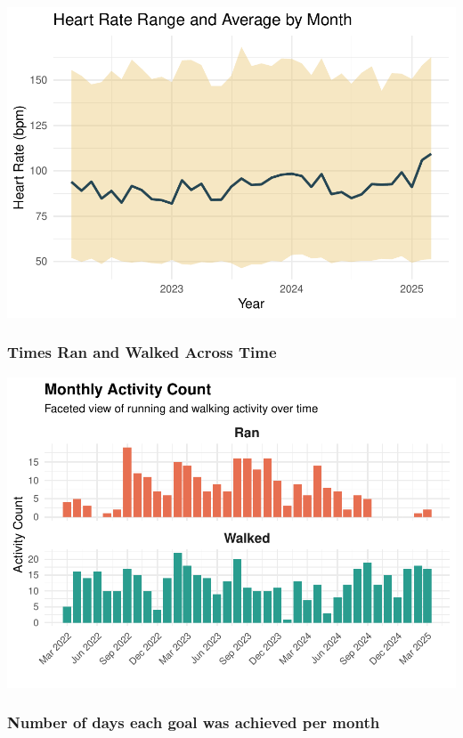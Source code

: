 \documentclass[
  11pt,
]{article}
\begin{document}
\includegraphics{analysis_files/figure-latex/unnamed-chunk-5-1.pdf}

\subsubsection{Times Ran and Walked Across
Time}\label{times-ran-and-walked-across-time}

\includegraphics{analysis_files/figure-latex/unnamed-chunk-6-1.pdf}

\subsubsection{Number of days each goal was achieved per
month}\label{number-of-days-each-goal-was-achieved-per-month}
\end{document}
